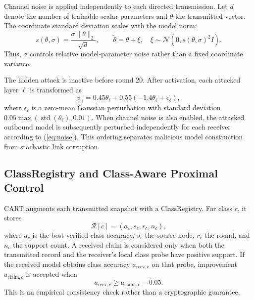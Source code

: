 \documentclass[conference]{IEEEtran}
\begin{document}
Channel noise is applied independently to each directed transmission. Let $d$ denote the number of trainable scalar parameters and $\theta$ the transmitted vector. The coordinate standard deviation scales with the model norm:
\begin{equation}
s(\theta,\sigma)=\frac{\sigma\|\theta\|_2}{\sqrt d}, \qquad
\widetilde{\theta}=\theta+\xi,\quad
\xi\sim\mathcal{N}(0,s(\theta,\sigma)^2I).
\label{eq:noise}
\end{equation}
Thus, $\sigma$ controls relative model-parameter noise rather than a fixed coordinate variance.

The hidden attack is inactive before round 20. After activation, each attacked layer $\ell$ is transformed as
\begin{equation}
\psi_\ell=0.45\theta_\ell+0.55(-1.4\theta_\ell+\epsilon_\ell),
\end{equation}
where $\epsilon_\ell$ is a zero-mean Gaussian perturbation with standard deviation $0.05\max(\operatorname{std}(\theta_\ell),0.01)$. When channel noise is also enabled, the attacked outbound model is subsequently perturbed independently for each receiver according to (\ref{eq:noise}). This ordering separates malicious model construction from stochastic link corruption.

\subsection{ClassRegistry and Class-Aware Proximal Control}
CART augments each transmitted snapshot with a ClassRegistry. For class $c$, it stores
\begin{equation}
\mathcal{R}[c]=(a_c,s_c,r_c,n_c),
\end{equation}
where $a_c$ is the best verified class accuracy, $s_c$ the source node, $r_c$ the round, and $n_c$ the support count. A received claim is considered only when both the transmitted record and the receiver's local class probe have positive support. If the received model obtains class accuracy $a_{\mathrm{recv},c}$ on that probe, improvement $a_{\mathrm{claim},c}$ is accepted when
\begin{equation}
a_{\mathrm{recv},c}\ge a_{\mathrm{claim},c}-0.05.
\end{equation}
This is an empirical consistency check rather than a cryptographic guarantee.
\end{document}
